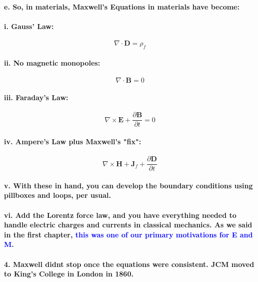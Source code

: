 \documentclass{article}
\begin{document}
\paragraph{\indent e. So, in materials, Maxwell's Equations in materials have become:}
\paragraph{\indent\indent i. Gauss' Law:}
\begin{equation*}
    \nabla\cdot\boldsymbol{D}=\rho_f
\end{equation*}
\paragraph{\indent\indent ii. No magnetic monopoles:}
\begin{equation*}
    \nabla\cdot\boldsymbol{B}=0
\end{equation*}
\paragraph{\indent\indent iii. Faraday's Law:}
\begin{equation*}
    \nabla\times\boldsymbol{E}+\frac{\partial\boldsymbol{B}}{\partial t}=0
\end{equation*}
\paragraph{\indent\indent iv. Ampere's Law plus Maxwell's "fix":}
\begin{equation*}
    \nabla\times\boldsymbol{H}+\boldsymbol{J}_f+\frac{\partial\boldsymbol{D}}{\partial t}
\end{equation*}
\paragraph{\indent\indent v. With these in hand, you can develop the boundary conditions using pillboxes and loops, per usual.}
\paragraph{\indent\indent vi. Add the Lorentz force law, and you have everything needed to handle electric charges and currents in classical mechanics. As we said in the first chapter, \textcolor{blue}{this was one of our primary motivations for E and M}.}
\paragraph{4. Maxwell didnt stop once the equations were consistent. JCM moved to King's College in London in 1860.}
\end{document}
